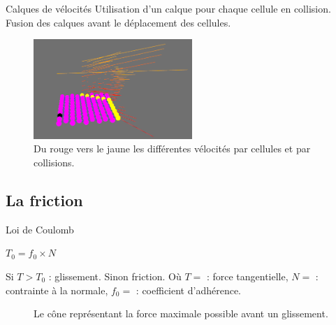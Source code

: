 \documentclass{beamer}
\begin{document}
\begin{frame}{Calques de vélocités}
  Utilisation d'un calque pour chaque cellule en collision. Fusion des calques avant le déplacement des cellules.
  \begin{figure}
    \begin{center}
      \includegraphics[width=6cm]{Images/calque.png}
    \end{center}
    \caption{Du rouge vers le jaune les différentes vélocités par cellules et par collisions.}
  \end{figure}
\end{frame}

\subsection{La friction}
\begin{frame}{Loi de Coulomb}
  \begin{center}
    $T_0 = f_0 \times N$
  \end{center}
  Si $T > T_0$ : glissement. Sinon friction. \smallbreak
  Où $T = $ : force tangentielle, $N = $ : contrainte à la normale, $f_0 = $ : coefficient d'adhérence.
  \begin{figure}
    \begin{center}
    \end{center}
    \caption{Le cône représentant la force maximale possible avant un glissement.}
  \end{figure}
\end{frame}
\end{document}
